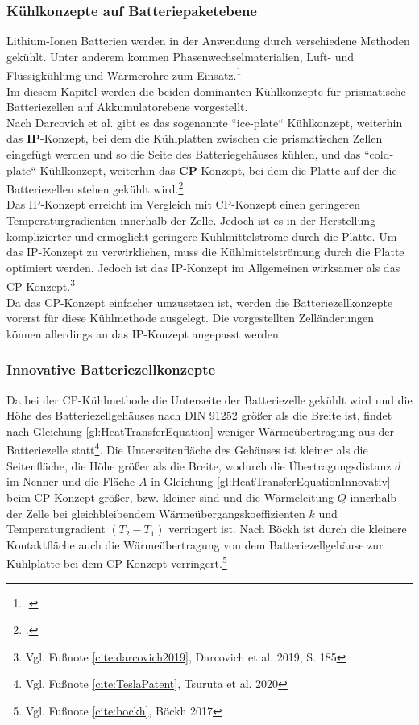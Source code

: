 \subsubsection{Kühlkonzepte auf Batteriepaketebene}\label{subsub:coolingforBatterypacks}

Lithium-Ionen Batterien werden in der Anwendung durch verschiedene Methoden gekühlt. Unter anderem kommen Phasenwechselmaterialien, Luft- und Flüssigkühlung und Wärmerohre zum Einsatz.\footcite[Vgl.][S. 1,2]{Mohammed.2018}\\
Im diesem Kapitel werden die beiden dominanten Kühlkonzepte für prismatische Batteriezellen auf Akkumulatorebene vorgestellt.\\
Nach Darcovich et al. gibt es das sogenannte ``ice-plate`` Kühlkonzept, weiterhin das \textbf{IP}-Konzept, bei dem die Kühlplatten zwischen die prismatischen Zellen eingefügt werden und so die Seite des Batteriegehäuses kühlen, und das ``cold-plate`` Kühlkonzept, weiterhin das \textbf{CP}-Konzept, bei dem die Platte auf der die Batteriezellen stehen gekühlt wird.\footcite[Vgl.\label{cite:darcovich2019}][S. 186-187]{Darcovich.2019}\\
Das IP-Konzept erreicht im Vergleich mit CP-Konzept einen geringeren Temperaturgradienten innerhalb der Zelle. Jedoch ist es in der Herstellung komplizierter und ermöglicht geringere Kühlmittelströme durch die Platte. Um das IP-Konzept zu verwirklichen, muss die Kühlmittelströmung durch die Platte optimiert werden. Jedoch ist das IP-Konzept im Allgemeinen wirksamer als das CP-Konzept.\footnote{Vgl. Fußnote \ref{cite:darcovich2019}, Darcovich et al. 2019, S. 185}\\
Da das CP-Konzept einfacher umzusetzen ist, werden die Batteriezellkonzepte vorerst für diese Kühlmethode ausgelegt. Die vorgestellten Zelländerungen können allerdings an das IP-Konzept angepasst werden. \\


\subsubsection{Innovative Batteriezellkonzepte}\label{subsub:innovativeBatteriezellkonzepte}

Da bei der CP-Kühlmethode die Unterseite der Batteriezelle gekühlt wird und die Höhe des Batteriezellgehäuses nach DIN 91252 größer als die Breite ist, findet nach Gleichung \ref{gl:HeatTransferEquation} weniger Wärmeübertragung aus der Batteriezelle statt\footnote{Vgl. Fußnote \ref{cite:TeslaPatent}, Tsuruta et al. 2020}. Die Unterseitenfläche des Gehäuses ist kleiner als die Seitenfläche, die Höhe größer als die Breite, wodurch die Übertragungsdistanz  $d$ im Nenner und die Fläche $A$ in Gleichung \ref{gl:HeatTransferEquationInnovativ} beim CP-Konzept größer, bzw. kleiner sind und die Wärmeleitung $\dot{Q}$ innerhalb der Zelle bei gleichbleibendem Wärmeübergangskoeffizienten $k$ und Temperaturgradient $(T_{2} - T_{1})$ verringert ist. Nach Böckh ist durch die kleinere Kontaktfläche auch die Wärmeübertragung von dem Batteriezellgehäuse zur Kühlplatte bei dem CP-Konzept verringert.\footnote{Vgl. Fußnote \ref{cite:bockh}, Böckh 2017}\\

